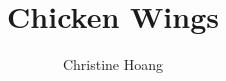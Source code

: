 \documentclass{article}
\title{Chicken Wings}
\author{Christine Hoang}
\begin{document}
\maketitle

\section{}
\end{document}
